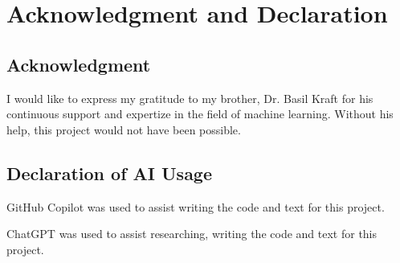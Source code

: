 


\section{Acknowledgment and Declaration}
\label{acknowledgment_declaration}

\subsection{Acknowledgment}

I would like to express my gratitude to my brother, Dr. Basil Kraft for his continuous
support and expertize in the field of machine learning. Without his help, this project would not 
have been possible.

\subsection{Declaration of AI Usage}

GitHub Copilot was used to assist writing the code and text for this project.

ChatGPT was used to assist researching, writing the code and text for this project.

